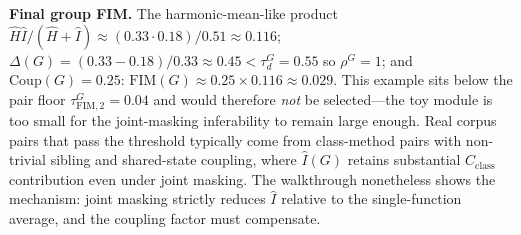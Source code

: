 \textbf{Final group FIM.} The harmonic-mean-like product
$\hat{H}\hat{I}/(\hat{H}+\hat{I})\!\approx\!(0.33\!\cdot\!0.18)/0.51\!\approx\!0.116$;
$\Delta(G)\!=\!(0.33-0.18)/0.33\!\approx\!0.45<\tau_d^G=0.55$ so
$\rho^G=1$; and $\mathrm{Coup}(G)=0.25$:
$\mathrm{FIM}(G)\approx 0.25\!\times\!0.116\!\approx\!0.029$. This
example sits below the pair floor $\tau^G_{\mathrm{FIM,2}}\!=\!0.04$ and
would therefore \emph{not} be selected---the toy module is too small
for the joint-masking inferability to remain large enough. Real corpus
pairs that pass the threshold typically come from class-method pairs
with non-trivial sibling and shared-state coupling, where $\hat{I}(G)$
retains substantial $C_{\mathrm{class}}$ contribution even under joint
masking. The walkthrough nonetheless shows the mechanism: joint masking
strictly reduces $\hat{I}$ relative to the single-function average,
and the coupling factor must compensate.


